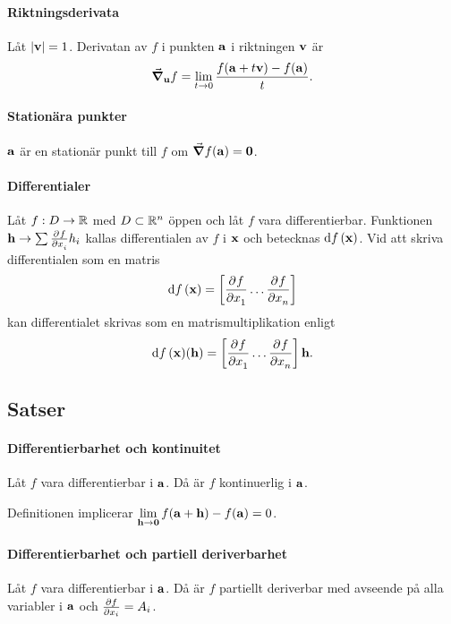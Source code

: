 \paragraph{Riktningsderivata}
Låt $\abs{\vect{v}} = 1$. Derivatan av $f$ i punkten $\vect{a}$ i riktningen $\vect{v}$ är
\begin{align*}
	\grad_{\vect{u}}f = \limit{t}{0}\frac{f(\vect{a} + t\vect{v}) - f(\vect{a})}{t}.
\end{align*}

\paragraph{Stationära punkter}
$\vect{a}$ är en stationär punkt till $f$ om $\grad{f}(\vect{a}) = \vect{0}$.

\paragraph{Differentialer}
Låt $f:D\to\mathbb{R}$ med $D\subset\mathbb{R}^n$ öppen och låt $f$ vara differentierbar. Funktionen $\vect{h}\to\sum\pdeval{f}{x_i}{\vect{x}}h_i$ kallas differentialen av $f$ i $\vect{x}$ och betecknas $\dd{f} (\vect{x})$. Vid att skriva differentialen som en matris
\begin{align*}
	\dd{f} (\vect{x}) = \left[\pdeval{f}{x_1}{\vect{x}}\dots\pdeval{f}{x_n}{\vect{x}}\right]
\end{align*}
kan differentialet skrivas som en matrismultiplikation enligt
\begin{align*}
	\dd{f} (\vect{x})(\vect{h}) = \left[\pdeval{f}{x_1}{\vect{x}}\dots\pdeval{f}{x_n}{\vect{x}}\right]\vect{h}.
\end{align*}

\subsection{Satser}

\paragraph{Differentierbarhet och kontinuitet}
Låt $f$ vara differentierbar i $\vect{a}$. Då är $f$ kontinuerlig i $\vect{a}$.

\proof
Definitionen implicerar $\limit{\vect{h}}{\vect{0}}f(\vect{a} + \vect{h}) - f(\vect{a}) = 0$.

\paragraph{Differentierbarhet och partiell deriverbarhet}
Låt $f$ vara differentierbar i $\vect{a}$. Då är $f$ partiellt deriverbar med avseende på alla variabler i $\vect{a}$ och $\pdv{f}{x_i}(\vect{a}) = A_i$.

